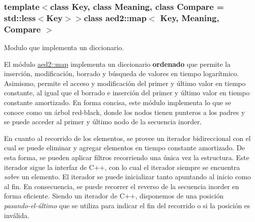 \subsubsection*{template$<$class Key, class Meaning, class Compare = std\-::less$<$\-Key$>$$>$class aed2\-::map$<$ Key, Meaning, Compare $>$}

Modulo que implementa un diccionario. 

El módulo \hyperlink{classaed2_1_1map}{aed2\-::map} implementa un diccionario {\bfseries ordenado} que permite la inserción, modificación, borrado y búsqueda de valores en tiempo logarítmico. Asimismo, permite el acceso y modificación del primer y último valor en tiempo constante, al igual que el borrado e inserción del primer y último valor en tiempo constante amortizado. En forma concisa, este módulo implementa lo que se conoce como un árbol red-\/black, donde los nodos tienen punteros a los padres y se puede acceder al primer y último nodo de la secuencia inorder.

En cuanto al recorrido de los elementos, se provee un iterador bidireccional con el cual se puede eliminar y agregar elementos en tiempo constante amortizado. De esta forma, se pueden aplicar filtros recorriendo una única vez la estructura. Este iterador sigue la interfaz de C++, con lo cual el iterador siempre se encuentra {\itshape sobre} un elemento. El iterador se puede inicializar tanto apuntando al inicio como al fin. En consecuencia, se puede recorrer el reverso de la secuencia inorder en forma eficiente. Siendo un iterador de C++, disponemos de una posición {\itshape pasando-\/el-\/último} que se utiliza para indicar el fin del recorrido o si la posición es inválida.


